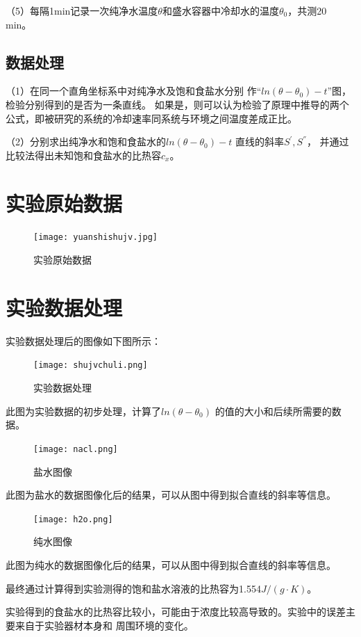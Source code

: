 \documentclass{ctexart}
\begin{document}
  （5）每隔1min记录一次纯净水温度$\theta$和盛水容器中冷却水的温度$\theta_{0}$，共测20 min。

  \subsection{数据处理}
  （1）在同一个直角坐标系中对纯净水及饱和食盐水分别
  作“$ln(\theta - \theta_{0}) - t$”图，
  检验分别得到的是否为一条直线。
  如果是，则可以认为检验了原理中推导的两个公式，即被研究的系统的冷却速率同系统与环境之间温度差成正比。

  （2）分别求出纯净水和饱和食盐水的$ln(\theta - \theta_{0}) - t$ 直线的斜率$S^{'} , S^{''}$，
  并通过比较法得出未知饱和食盐水的比热容$c_{x}$。
\newpage

\section{实验原始数据}
\begin{figure}[H]
  \centering
  \texttt{[image: yuanshishujv.jpg]}
  \caption{实验原始数据}
\end{figure}
\newpage


\section{实验数据处理}
实验数据处理后的图像如下图所示：
\begin{figure}[H]
  \centering
  \texttt{[image: shujvchuli.png]}
  \caption{实验数据处理}
\end{figure}

此图为实验数据的初步处理，计算了$ln(\theta - \theta_{0})$ 的值的大小和后续所需要的数据。

\begin{figure}[H]
  \centering
  \texttt{[image: nacl.png]}
  \caption{盐水图像}
\end{figure}

此图为盐水的数据图像化后的结果，可以从图中得到拟合直线的斜率等信息。

\begin{figure}[H]
  \centering
  \texttt{[image: h2o.png]}
  \caption{纯水图像}
\end{figure}

此图为纯水的数据图像化后的结果，可以从图中得到拟合直线的斜率等信息。

最终通过计算得到实验测得的饱和盐水溶液的比热容为1.554$J / (g \cdot K)$。

实验得到的食盐水的比热容比较小，可能由于浓度比较高导致的。实验中的误差主要来自于实验器材本身和
周围环境的变化。
\end{document}
